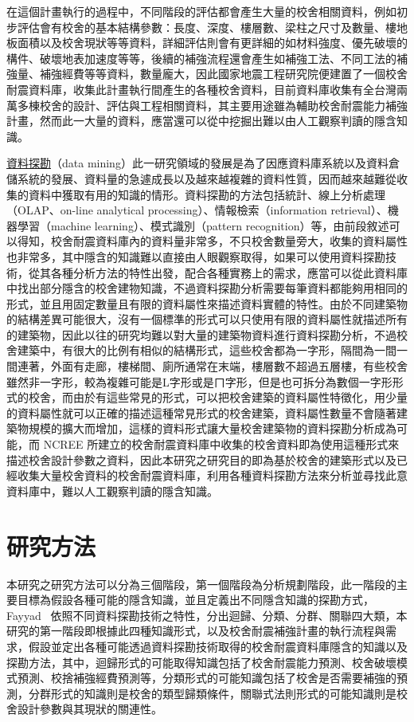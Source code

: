 在這個計畫執行的過程中，不同階段的評估都會產生大量的校舍相關資料，例如初步評估會有校舍的基本結構參數：長度、深度、樓層數、梁柱之尺寸及數量、樓地板面積以及校舍現狀等等資料，詳細評估則會有更詳細的如材料強度、優先破壞的構件、破壞地表加速度等等，後續的補強流程還會產生如補強工法、不同工法的補強量、補強經費等等資料，數量龐大，因此國家地震工程研究院便建置了一個校舍耐震資料庫，收集此計畫執行間產生的各種校舍資料，目前資料庫收集有全台灣兩萬多棟校舍的設計、評估與工程相關資料，其主要用途雖為輔助校舍耐震能力補強計畫，然而此一大量的資料，應當還可以從中挖掘出難以由人工觀察判讀的隱含知識。

\underline{資料探勘}（data mining）此一研究領域的發展是為了因應資料庫系統以及資料倉儲系統的發展、資料量的急遽成長以及越來越複雜的資料性質，因而越來越難從收集的資料中獲取有用的知識的情形。資料探勘的方法包括統計、線上分析處理（OLAP、on-line analytical processing）、情報檢索（information retrieval）、機器學習（machine learning）、模式識別（pattern recognition）等，由前段敘述可以得知，校舍耐震資料庫內的資料量非常多，不只校舍數量旁大，收集的資料屬性也非常多，其中隱含的知識難以直接由人眼觀察取得，如果可以使用資料探勘技術，從其各種分析方法的特性出發，配合各種實務上的需求，應當可以從此資料庫中找出部分隱含的校舍建物知識，不過資料探勘分析需要每筆資料都能夠用相同的形式，並且用固定數量且有限的資料屬性來描述資料實體的特性。由於不同建築物的結構差異可能很大，沒有一個標準的形式可以只使用有限的資料屬性就描述所有的建築物，因此以往的研究均難以對大量的建築物資料進行資料探勘分析，不過校舍建築中，有很大的比例有相似的結構形式，這些校舍都為一字形，隔間為一間一間連著，外面有走廊，樓梯間、廁所通常在末端，樓層數不超過五層樓，有些校舍雖然非一字形，較為複雜可能是L字形或是ㄇ字形，但是也可拆分為數個一字形形式的校舍，而由於有這些常見的形式，可以把校舍建築的資料屬性特徵化，用少量的資料屬性就可以正確的描述這種常見形式的校舍建築，資料屬性數量不會隨著建築物規模的擴大而增加，這樣的資料形式讓大量校舍建築物的資料探勘分析成為可能，而 NCREE 所建立的校舍耐震資料庫中收集的校舍資料即為使用這種形式來描述校舍設計參數之資料，因此本研究之研究目的即為基於校舍的建築形式以及已經收集大量校舍資料的校舍耐震資料庫，利用各種資料探勘方法來分析並尋找此意資料庫中，難以人工觀察判讀的隱含知識。

\section{研究方法}

本研究之研究方法可以分為三個階段，第一個階段為分析規劃階段，此一階段的主要目標為假設各種可能的隱含知識，並且定義出不同隱含知識的探勘方式，Fayyad~\cite{fayyad1996data} 依照不同資料探勘技術之特性，分出迴歸、分類、分群、關聯四大類，本研究的第一階段即根據此四種知識形式，以及校舍耐震補強計畫的執行流程與需求，假設並定出各種可能透過資料探勘技術取得的校舍耐震資料庫隱含的知識以及探勘方法，其中，迴歸形式的可能取得知識包括了校舍耐震能力預測、校舍破壞模式預測、校捨補強經費預測等，分類形式的可能知識包括了校舍是否需要補強的預測，分群形式的知識則是校舍的類型歸類條件，關聯式法則形式的可能知識則是校舍設計參數與其現狀的關連性。

